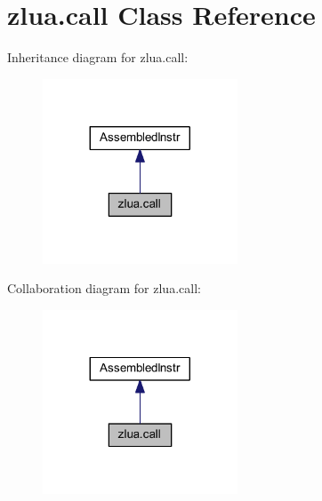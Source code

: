 \hypertarget{classzlua_1_1call}{}\section{zlua.\+call Class Reference}
\label{classzlua_1_1call}


Inheritance diagram for zlua.\+call\+:
\nopagebreak
\begin{figure}[H]
\begin{center}
\leavevmode
\includegraphics[width=164pt]{classzlua_1_1call__inherit__graph}
\end{center}
\end{figure}


Collaboration diagram for zlua.\+call\+:
\nopagebreak
\begin{figure}[H]
\begin{center}
\leavevmode
\includegraphics[width=164pt]{classzlua_1_1call__coll__graph}
\end{center}
\end{figure}
